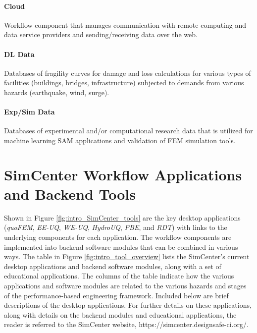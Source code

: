 \paragraph{Cloud} Workflow component that manages communication with remote computing and data service providers and sending/receiving data over the web.

\paragraph{DL Data}  Databases of fragility curves for damage and loss calculations for various types of facilities (buildings, bridges, infrastructure) subjected to demands from various hazards (earthquake, wind, surge).

\paragraph{Exp/Sim Data} Databases of experimental and/or computational research data that is utilized for machine learning SAM applications and validation of FEM simulation tools.

\section{SimCenter Workflow Applications and Backend Tools}

Shown in Figure \ref{fig:intro_SimCenter_tools} are the key desktop applications (\emph{quoFEM}, \emph{EE-UQ}, \emph{WE-UQ}, \emph{HydroUQ}, \emph{PBE}, and \emph{RDT}) with links to the underlying components for each application. The workflow components are implemented into backend software modules that can be combined in various ways.  The table in Figure \ref{fig:intro_tool_overview} lists the SimCenter’s current desktop applications and backend software modules, along with a set of educational applications.  The columns of the table indicate how the various applications and software modules are related to the various hazards and stages of the performance-based engineering framework. Included below are brief descriptions of the desktop applications.  For further details on these applications, along with details on the backend modules and educational applications, the reader is referred to the SimCenter website, https://simcenter.designsafe-ci.org/. 

